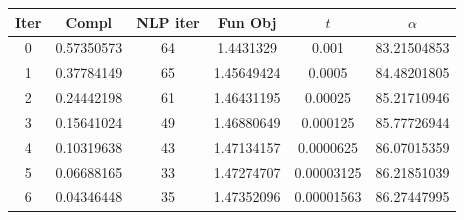 \begin{tabular}{c c c c c c}
\toprule
Iter & Compl & NLP iter & Fun Obj & $t$ & $\alpha$ \\
\midrule
0 & 0.57350573 & 64 & 1.4431329 & 0.001 & 83.21504853 \\
1 & 0.37784149 & 65 & 1.45649424 & 0.0005 & 84.48201805 \\
2 & 0.24442198 & 61 & 1.46431195 & 0.00025 & 85.21710946 \\
3 & 0.15641024 & 49 & 1.46880649 & 0.000125 & 85.77726944 \\
4 & 0.10319638 & 43 & 1.47134157 & 0.0000625 & 86.07015359 \\
5 & 0.06688165 & 33 & 1.47274707 & 0.00003125 & 86.21851039 \\
6 & 0.04346448 & 35 & 1.47352096 & 0.00001563 & 86.27447995 \\
\bottomrule
\end{tabular}